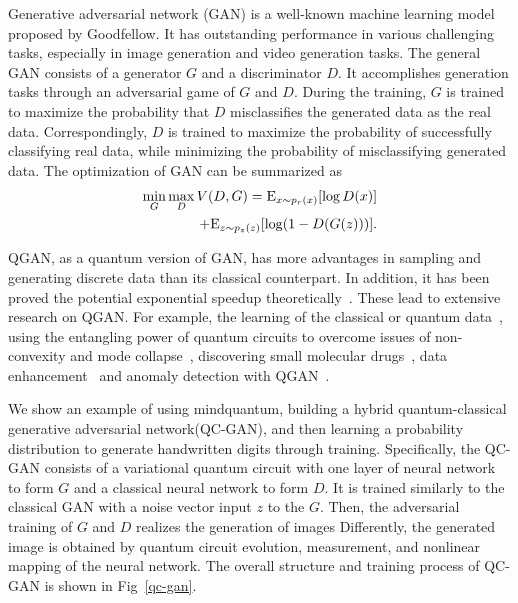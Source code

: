 Generative adversarial network (GAN) is a well-known machine learning model proposed by Goodfellow. It has outstanding performance in various challenging tasks, especially in image generation and video generation tasks. The general GAN consists of a generator ${G}$ and a discriminator ${D}$. It accomplishes generation tasks through an adversarial game of ${G}$ and ${D}$. During the training, ${G}$ is trained to maximize the probability that ${D}$ misclassifies the generated data as the real data. Correspondingly, ${D}$ is trained to maximize the probability of successfully classifying real data, while minimizing the probability of misclassifying generated data. The optimization of GAN can be summarized as
\begin{equation}
  \begin{split}
    \mathop {\min }\limits_G \mathop {\max }\limits_D V(D,G) = {\rm{ }}{{\rm{E}}_{x\sim{p_r}(x)}}[\log D(x)]
    \\+ {{\rm{E}}_{z\sim{p_z}(z)}}[\log (1 - D(G(z)))]. \label{eq1}
  \end{split}
\end{equation}

QGAN, as a quantum version of GAN, has more advantages in sampling and generating discrete data than its classical counterpart. In addition, it has been proved the potential exponential speedup theoretically~\cite{lloyd2018quantum}. These lead to extensive research on QGAN. For example, the learning of the classical or quantum data~\cite{benedetti2019adversarial, zeng2019learning, zoufal2019quantum,ahmed2021quantum}, using the entangling power of quantum circuits to overcome issues of non-convexity and mode collapse~\cite{niu2022entangling}, discovering small molecular drugs~\cite{li2021quantum}, data enhancement~\cite{nakaji2021quantum} and anomaly detection with QGAN~\cite{herr2021anomaly}.

We show an example of using mindquantum, building a hybrid quantum-classical generative adversarial network(QC-GAN), and then learning a probability distribution to generate handwritten digits through training. Specifically, the QC-GAN consists of a variational quantum circuit with one layer of neural network to form ${G}$ and a classical neural network to form ${D}$. It is trained similarly to the classical GAN with a noise vector input ${z}$ to the ${G}$. Then, the adversarial training of ${G}$ and ${D}$ realizes the generation of images
Differently, the generated image is obtained by quantum circuit evolution, measurement, and nonlinear mapping of the neural network. The overall structure and training process of QC-GAN is shown in Fig~\ref{qc-gan}.

